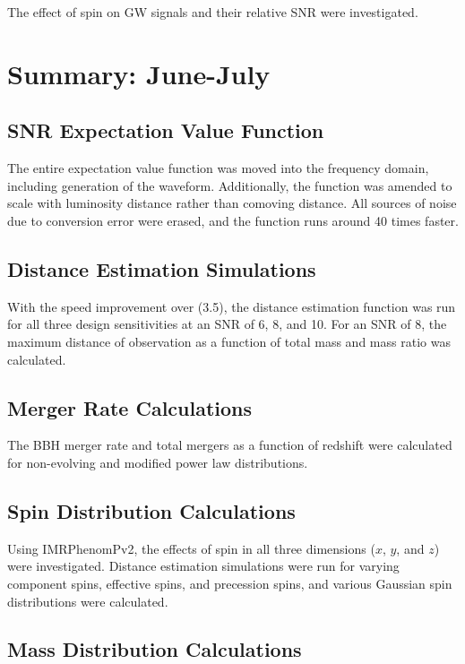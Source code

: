 \documentclass[10pt]{article}
\begin{document}
\begin{multicols*}{2}
The effect of spin on GW signals and their relative SNR were investigated. 

\section{Summary: June-July}

\subsection{SNR Expectation Value Function}

The entire expectation value function was moved into the frequency domain, including generation of the waveform. Additionally, the function was amended to scale with luminosity distance rather than comoving distance. All sources of noise due to conversion error were erased, and the function runs around 40 times faster. 

\subsection{Distance Estimation Simulations}

With the speed improvement over (3.5), the distance estimation function was run for all three design sensitivities at an SNR of 6, 8, and 10. For an SNR of 8, the maximum distance of observation as a function of total mass and mass ratio was calculated. 

\subsection{Merger Rate Calculations}

The BBH merger rate and total mergers as a function of redshift were calculated for non-evolving and modified power law distributions. 

\subsection{Spin Distribution Calculations}

Using IMRPhenomPv2, the effects of spin in all three dimensions ($x$, $y$, and $z$) were investigated. Distance estimation simulations were run for varying component spins, effective spins, and precession spins, and various Gaussian spin distributions were calculated. 

\subsection{Mass Distribution Calculations}


\end{multicols*}
\end{document}

